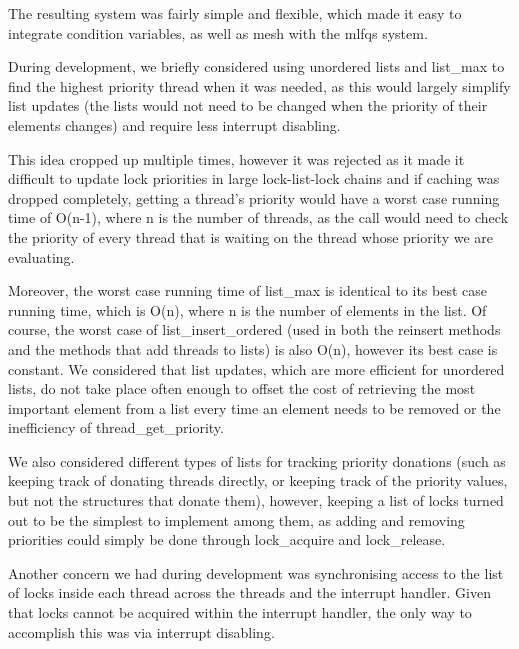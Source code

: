 The resulting system was fairly simple and flexible, which made it easy to integrate condition variables, as well as mesh with the mlfqs system.


During development, we briefly considered using unordered lists and list\_max to find the highest priority thread when it was needed, as this would largely simplify list updates (the lists would not need to be changed when the priority of their elements changes) and require less interrupt disabling.

This idea cropped up multiple times, however it was rejected as it made it difficult to update lock priorities in large lock-list-lock chains and if caching was dropped completely, getting a thread's priority would have a worst case running time of O(n-1), where n is the number of threads, as the call would need to check the priority of every thread that is waiting on the thread whose priority we are evaluating.

Moreover, the worst case running time of list\_max is identical to its best case running time, which is O(n), where n is the number of elements in the list.
Of course, the worst case of list\_insert\_ordered (used in both the reinsert methods and the methods that add threads to lists) is also O(n), however its best case is constant.
We considered that list updates, which are more efficient for unordered lists, do not take place often enough to offset the cost of retrieving the most important element from a list every time an element needs to be removed or the inefficiency of thread\_get\_priority.

We also considered different types of lists for tracking priority donations (such as keeping track of donating threads directly, or keeping track of the priority values, but not the structures that donate them), however, keeping a list of locks turned out to be the simplest to implement among them, as adding and removing priorities could simply be done through lock\_acquire and lock\_release.

Another concern we had during development was synchronising access to the list of locks inside each thread across the threads and the interrupt handler. Given that locks cannot be acquired within the interrupt handler, the only way to accomplish this was via interrupt disabling.
